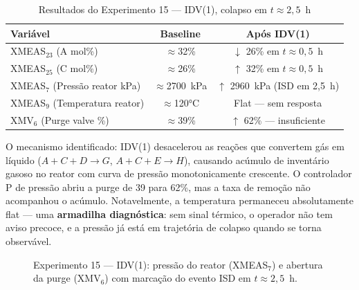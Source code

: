 \begin{table}[ht!]
\centering
\caption{Resultados do Experimento 15 — IDV(1), colapso em $t \approx 2{,}5$~h}
\label{tab:exp15}
\begin{tabular}{|l|c|c|}
\hline
\textbf{Variável}              & \textbf{Baseline}   & \textbf{Após IDV(1)}              \\
\hline
XMEAS$_{23}$ (A mol\%)         & $\approx$32\%       & $\downarrow$ 26\% em $t \approx 0{,}5$~h \\
XMEAS$_{25}$ (C mol\%)         & $\approx$26\%       & $\uparrow$ 32\% em $t \approx 0{,}5$~h  \\
XMEAS$_7$ (Pressão reator kPa) & $\approx$2700~kPa   & $\uparrow$ 2960~kPa (ISD em 2{,}5~h)     \\
XMEAS$_9$ (Temperatura reator) & $\approx$120°C      & Flat — sem resposta                      \\
XMV$_6$ (Purge valve \%)       & $\approx$39\%       & $\uparrow$ 62\% — insuficiente            \\
\hline
\end{tabular}
\end{table}

O mecanismo identificado: IDV(1) desacelerou as reações que convertem gás em líquido ($A + C + D \to G$, $A + C + E \to H$), causando acúmulo de inventário gasoso no reator com curva de pressão monotonicamente crescente. O controlador P de pressão abriu a purge de 39 para 62\%, mas a taxa de remoção não acompanhou o acúmulo. Notavelmente, a temperatura permaneceu absolutamente flat — uma \textbf{armadilha diagnóstica}: sem sinal térmico, o operador não tem aviso precoce, e a pressão já está em trajetória de colapso quando se torna observável.

\begin{figure}[htbp]
\centering
{}
\caption{Experimento 15 --- IDV(1): pressão do reator (XMEAS$_7$) e abertura da purge (XMV$_6$) com marcação do evento ISD em $t \approx 2{,}5$~h.}
\label{fig:exp15_pressure}
\end{figure}

